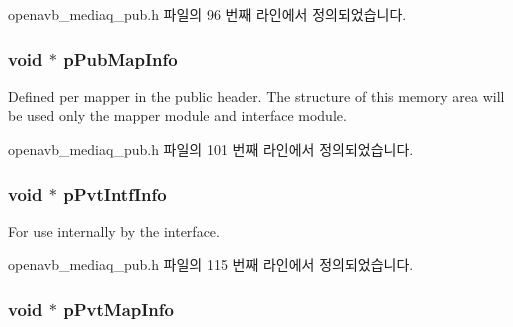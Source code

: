 openavb\+\_\+mediaq\+\_\+pub.\+h 파일의 96 번째 라인에서 정의되었습니다.

\subsubsection[{\texorpdfstring{p\+Pub\+Map\+Info}{pPubMapInfo}}]{\setlength{\rightskip}{0pt plus 5cm}void $\ast$ p\+Pub\+Map\+Info}\hypertarget{structmedia__q__t_a0226ccb90fbafac84294a908013853b4}{}\label{structmedia__q__t_a0226ccb90fbafac84294a908013853b4}
Defined per mapper in the public header. The structure of this memory area will be used only the mapper module and interface module. 

openavb\+\_\+mediaq\+\_\+pub.\+h 파일의 101 번째 라인에서 정의되었습니다.

\subsubsection[{\texorpdfstring{p\+Pvt\+Intf\+Info}{pPvtIntfInfo}}]{\setlength{\rightskip}{0pt plus 5cm}void $\ast$ p\+Pvt\+Intf\+Info\hspace{0.3cm}{\ttfamily [private]}}\hypertarget{structmedia__q__t_a453af4755f0cf9b8fe035e62ecea845f}{}\label{structmedia__q__t_a453af4755f0cf9b8fe035e62ecea845f}


For use internally by the interface. 



openavb\+\_\+mediaq\+\_\+pub.\+h 파일의 115 번째 라인에서 정의되었습니다.

\subsubsection[{\texorpdfstring{p\+Pvt\+Map\+Info}{pPvtMapInfo}}]{\setlength{\rightskip}{0pt plus 5cm}void $\ast$ p\+Pvt\+Map\+Info\hspace{0.3cm}{\ttfamily [private]}}\hypertarget{structmedia__q__t_aee939b53d02a9217a5307ada087f3c50}{}\label{structmedia__q__t_aee939b53d02a9217a5307ada087f3c50}


